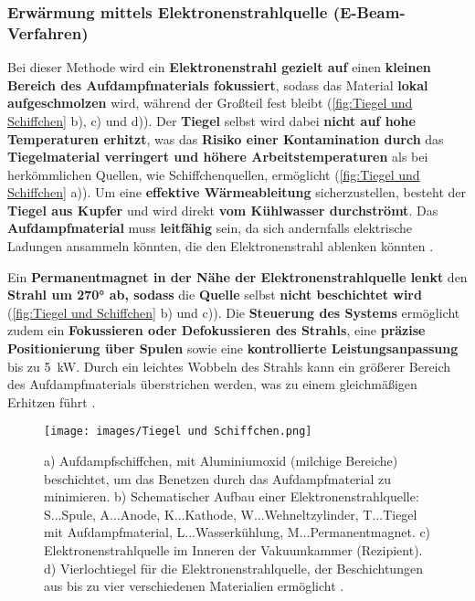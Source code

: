 \documentclass{article} %
\begin{document}
\vspace{1em}
\subsubsection{Erwärmung mittels Elektronenstrahlquelle (E-Beam-Verfahren)}

Bei dieser Methode wird ein \textbf{Elektronenstrahl gezielt auf} einen \textbf{kleinen Bereich des Aufdampfmaterials fokussiert}, sodass das 
Material \textbf{lokal aufgeschmolzen} wird, während der Großteil fest bleibt (\autoref{fig:Tiegel und Schiffchen} b), c) und d)). Der 
\textbf{Tiegel} selbst wird dabei \textbf{nicht auf hohe Temperaturen erhitzt}, was das \textbf{Risiko einer Kontamination durch} das 
\textbf{Tiegelmaterial verringert und höhere Arbeitstemperaturen} als bei herkömmlichen Quellen, wie Schiffchenquellen, ermöglicht 
(\autoref{fig:Tiegel und Schiffchen} a)). Um eine \textbf{effektive Wärmeableitung} sicherzustellen, besteht der \textbf{Tiegel aus Kupfer} und 
wird direkt \textbf{vom Kühlwasser durchströmt}. Das \textbf{Aufdampfmaterial} muss \textbf{leitfähig} sein, da sich andernfalls elektrische 
Ladungen ansammeln könnten, die den Elektronenstrahl ablenken könnten \cite{keplinger2024}.

\vspace{1em}

Ein \textbf{Permanentmagnet in der Nähe der Elektronenstrahlquelle lenkt} den \textbf{Strahl um 270° ab, sodass} die \textbf{Quelle} selbst 
\textbf{nicht beschichtet wird} (\autoref{fig:Tiegel und Schiffchen} b) und c)). Die \textbf{Steuerung des Systems} ermöglicht zudem ein 
\textbf{Fokussieren oder Defokussieren des Strahls}, eine \textbf{präzise Positionierung über Spulen} sowie eine \textbf{kontrollierte 
Leistungsanpassung} bis zu 5~kW. Durch ein leichtes Wobbeln des Strahls kann ein größerer Bereich des Aufdampfmaterials überstrichen werden, was
 zu einem gleichmäßigen Erhitzen führt \cite{keplinger2024}.

\begin{figure}[htb!]
    \centering
    \texttt{[image: images/Tiegel und Schiffchen.png]} %
    \captionsetup{labelfont=bf} %
    \caption{%
    a) Aufdampfschiffchen, mit Aluminiumoxid (milchige Bereiche) beschichtet, um das Benetzen durch das Aufdampfmaterial zu minimieren. 
    b) Schematischer Aufbau einer Elektronenstrahlquelle: S...Spule, A...Anode, K...Kathode, W...Wehneltzylinder, T...Tiegel mit 
    Aufdampfmaterial, L...Wasserkühlung, M...Permanentmagnet.  
    c) Elektronenstrahlquelle im Inneren der Vakuumkammer (Rezipient). 
    d) Vierlochtiegel für die Elektronenstrahlquelle, der Beschichtungen aus bis zu vier verschiedenen Materialien ermöglicht 
    \cite{keplinger2024}.
    }
    \label{fig:Tiegel und Schiffchen}
\end{figure}
\end{document}

